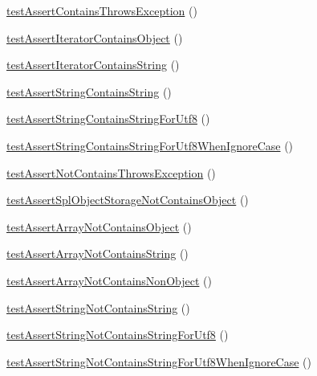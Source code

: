 \begin{DoxyCompactItemize}
\item 
\mbox{\hyperlink{class_framework___assert_test_a9fe0e3a00d4396162232443768fc0a16}{test\+Assert\+Contains\+Throws\+Exception}} ()
\item 
\mbox{\hyperlink{class_framework___assert_test_a695a5cf6c5fae89775f74f9d5dddfff3}{test\+Assert\+Iterator\+Contains\+Object}} ()
\item 
\mbox{\hyperlink{class_framework___assert_test_a900bdb3b9da1d6ff103c449c3b192fa5}{test\+Assert\+Iterator\+Contains\+String}} ()
\item 
\mbox{\hyperlink{class_framework___assert_test_a579a27a00ec48f7908d8e984e4f324aa}{test\+Assert\+String\+Contains\+String}} ()
\item 
\mbox{\hyperlink{class_framework___assert_test_a368e41c7cbcab9f019296eccf0e7f46a}{test\+Assert\+String\+Contains\+String\+For\+Utf8}} ()
\item 
\mbox{\hyperlink{class_framework___assert_test_aff345f5c1e0a1d9eef22dcc8db73b102}{test\+Assert\+String\+Contains\+String\+For\+Utf8\+When\+Ignore\+Case}} ()
\item 
\mbox{\hyperlink{class_framework___assert_test_ad180642295e072ee53b42a3bb3a22351}{test\+Assert\+Not\+Contains\+Throws\+Exception}} ()
\item 
\mbox{\hyperlink{class_framework___assert_test_a9fdd6b53f51c5bca351acbe787a9dabf}{test\+Assert\+Spl\+Object\+Storage\+Not\+Contains\+Object}} ()
\item 
\mbox{\hyperlink{class_framework___assert_test_aee38f5475ce31129688d9dc494c00d24}{test\+Assert\+Array\+Not\+Contains\+Object}} ()
\item 
\mbox{\hyperlink{class_framework___assert_test_a2bc160ede9404fbb8aacc6ebd5d1f94f}{test\+Assert\+Array\+Not\+Contains\+String}} ()
\item 
\mbox{\hyperlink{class_framework___assert_test_a0990fbaa869e4369a2f6ff45c8efe114}{test\+Assert\+Array\+Not\+Contains\+Non\+Object}} ()
\item 
\mbox{\hyperlink{class_framework___assert_test_a8beb0af8bd4dac1d050652ba5e427b28}{test\+Assert\+String\+Not\+Contains\+String}} ()
\item 
\mbox{\hyperlink{class_framework___assert_test_a5b02fa78b536df006a0f083f827271eb}{test\+Assert\+String\+Not\+Contains\+String\+For\+Utf8}} ()
\item 
\mbox{\hyperlink{class_framework___assert_test_a5ee7fe546fd586536eeb09d667a4b940}{test\+Assert\+String\+Not\+Contains\+String\+For\+Utf8\+When\+Ignore\+Case}} ()
\item 

\end{DoxyCompactItemize}
